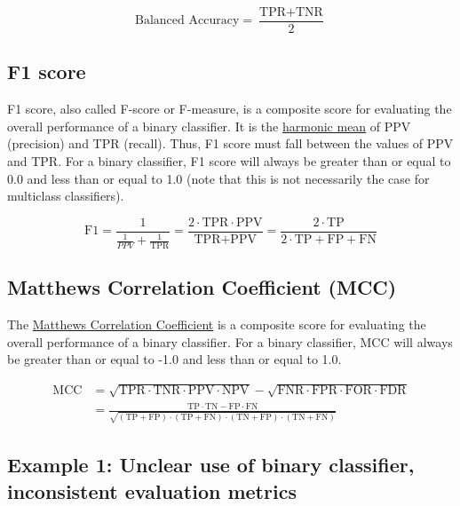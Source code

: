 \documentclass[letterpaper, 12pt]{article}
\begin{document}
$$\textrm{Balanced Accuracy} = \frac{\textrm{TPR} + \textrm{TNR}}{2}$$

\subsection*{F1 score}

F1 score, also called F-score or F-measure, is a composite score for evaluating the overall performance of a binary classifier. It is the \href{https://en.wikipedia.org/wiki/Harmonic_mean}{harmonic mean} of PPV (precision) and TPR (recall). Thus, F1 score must fall between the values of PPV and TPR. For a binary classifier, F1 score will always be greater than or equal to 0.0 and less than or equal to 1.0 (note that this is not necessarily the case for multiclass classifiers).

$$\textrm{F1} = \frac{1}{\frac{1}{PPV} + \frac{1}{\textrm{TPR}}} = \frac{2 \cdot \textrm{TPR} \cdot \textrm{PPV}}{\textrm{TPR} + \textrm{PPV}} = \frac{2 \cdot \textrm{TP}}{2 \cdot \textrm{TP} + \textrm{FP} + \textrm{FN}}$$

\subsection*{Matthews Correlation Coefficient (MCC)}

The \href{https://en.wikipedia.org/wiki/Phi_coefficient}{Matthews Correlation Coefficient} is a composite score for evaluating the overall performance of a binary classifier. For a binary classifier, MCC will always be greater than or equal to -1.0 and less than or equal to 1.0.

\begin{align*} 
\textrm{MCC} &= \sqrt{\textrm{TPR} \cdot \textrm{TNR} \cdot \textrm{PPV} \cdot \textrm{NPV}} - \sqrt{\textrm{FNR} \cdot \textrm{FPR} \cdot \textrm{FOR} \cdot \textrm{FDR}}\\ 
 &= \frac{\textrm{TP}\cdot\textrm{TN}-\textrm{FP}\cdot\textrm{FN}}{\sqrt{ (\textrm{TP}+\textrm{FP})\cdot(\textrm{TP}+\textrm{FN})\cdot(\textrm{TN}+\textrm{FP})\cdot(\textrm{TN}+\textrm{FN}) }}\
\end{align*}

\pagebreak

\subsection*{Example 1: Unclear use of binary classifier, inconsistent evaluation metrics}
\end{document}
